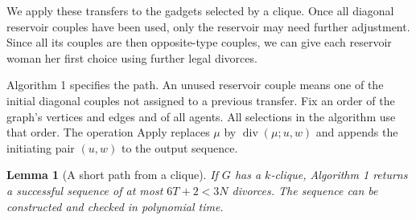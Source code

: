 \documentclass[11pt,letterpaper]{article}
\newtheorem{lemma}{Lemma}
\theoremstyle{definition}
\begin{document}
We apply these transfers to the gadgets selected by a clique. Once all diagonal reservoir couples have been used, only the reservoir may need further adjustment. Since all its couples are then opposite-type couples, we can give each reservoir woman her first choice using further legal divorces.

Algorithm 1 specifies the path. An unused reservoir couple means one of the initial diagonal couples not assigned to a previous transfer. Fix an order of the graph's vertices and edges and of all agents. All selections in the algorithm use that order. The operation Apply replaces $\mu$ by $\operatorname{div}(\mu;u,w)$ and appends the initiating pair $(u,w)$ to the output sequence.

\begin{lemma}[A short path from a clique]
If $G$ has a $k$-clique, Algorithm 1 returns a successful sequence of at most $6T+2<3N$ divorces. The sequence can be constructed and checked in polynomial time.
\end{lemma}
\end{document}
